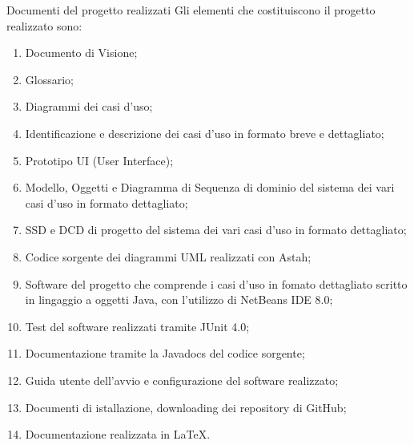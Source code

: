 \documentclass[t]{beamer} %
\let\olditem=\item%
\renewcommand{\item}{\olditem \justifying}%
\begin{document}
 \begin{frame} [allowframebreaks] {Documenti del progetto realizzati }
   Gli elementi che costituiscono il progetto realizzato sono:
   \begin{enumerate} 
     \item Documento di Visione;
     \item Glossario;
     \item Diagrammi dei casi d'uso;
     \item Identificazione e descrizione dei casi d'uso in formato breve e dettagliato;
     \item Prototipo UI (User Interface);
     \item Modello, Oggetti e Diagramma di Sequenza di dominio del sistema dei vari casi d'uso in formato dettagliato;
     \item SSD e DCD di progetto del sistema dei vari casi d'uso in formato dettagliato;
     \item Codice sorgente dei diagrammi UML realizzati con Astah;
     \item Software del progetto che comprende i casi d'uso in fomato dettagliato scritto in lingaggio a oggetti Java, 
           con l'utilizzo di NetBeans IDE 8.0;
     \item Test del software realizzati tramite JUnit 4.0; 
     \item Documentazione tramite la Javadocs del codice sorgente; 
     \item Guida utente dell'avvio e configurazione del software realizzato;
     \item Documenti di istallazione, downloading dei repository di GitHub;
     \item Documentazione realizzata in \LaTeX.
   \end{enumerate}
 \end{frame}
\end{document}
